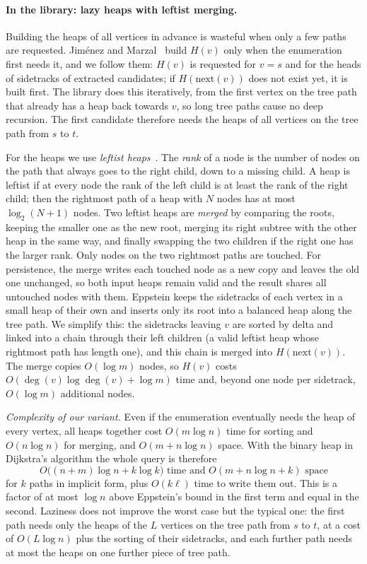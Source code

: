 \documentclass[11pt,a4paper]{article}
\begin{document}
\paragraph{In the library: lazy heaps with leftist merging.}
Building the heaps of all vertices in advance is wasteful when only a few paths are requested. Jiménez and
Marzal~\cite{jimenez2003} build $H(v)$ only when the enumeration first needs it, and we follow them: $H(v)$ is
requested for $v=s$ and for the heads of sidetracks of extracted candidates; if $H(\mathrm{next}(v))$ does not exist
yet, it is built first. The library does this iteratively, from the first vertex on the tree path that already has
a heap back towards $v$, so long tree paths cause no deep recursion. The first candidate therefore needs the
heaps of all vertices on the tree path from $s$ to $t$.

For the heaps we use \emph{leftist heaps}~\cite{crane1972}. The \emph{rank} of a node is the number of nodes on the
path that always goes to the right child, down to a missing child. A heap is leftist if at every node the rank
of the left child is at least the rank of the right child; then the rightmost path of a heap with $N$ nodes has at
most $\log_2(N+1)$ nodes. Two leftist heaps are \emph{merged} by comparing the roots, keeping the smaller one as the
new root, merging its right subtree with the other heap in the same way, and finally swapping the two children if
the right one has the larger rank. Only nodes on the two rightmost paths are touched. For persistence, the merge
writes each touched node as a new copy and leaves the old one unchanged, so both input heaps remain valid and the
result shares all untouched nodes with them. Eppstein keeps the sidetracks of each vertex in a small heap of their
own and inserts only its root into a balanced heap along the tree path. We simplify this: the sidetracks leaving
$v$ are sorted by delta and linked into a chain through their left children (a valid leftist heap whose rightmost
path has length one), and this chain is merged into $H(\mathrm{next}(v))$. The merge copies $O(\log m)$ nodes, so
$H(v)$ costs $O(\deg(v)\log\deg(v)+\log m)$ time and, beyond one node per sidetrack, $O(\log m)$ additional nodes.

\emph{Complexity of our variant.} Even if the enumeration eventually needs the heap of every vertex, all heaps
together cost $O(m\log n)$ time for sorting and $O(n\log n)$ for merging, and $O(m+n\log n)$ space. With the binary
heap in Dijkstra's algorithm the whole query is therefore
\[O\bigl((n+m)\log n+k\log k\bigr)\text{ time and }O(m+n\log n+k)\text{ space}\]
for $k$ paths in implicit form, plus $O(k\ell)$ time to write them out. This is a factor of at most $\log n$ above
Eppstein's bound in the first term and equal in the second. Laziness does not improve the worst case but the
typical one: the first path needs only the heaps of the $L$ vertices on the tree path from $s$ to $t$, at a cost of
$O(L\log n)$ plus the sorting of their sidetracks, and each further path needs at most the heaps on one further
piece of tree path.
\end{document}
